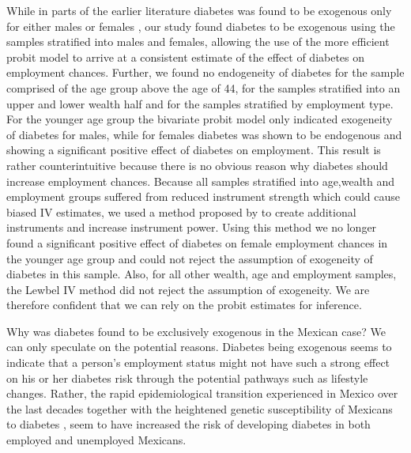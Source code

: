 While in parts of the earlier literature diabetes was found
to be exogenous only for either males or females \parencite{Brown2005,Latif2009},
our study found diabetes to be exogenous using the samples stratified
into males and females, allowing the use of the more efficient probit
model to arrive at a consistent estimate of the effect of diabetes
on employment chances. Further, we found no endogeneity of diabetes
for the sample comprised of the age group above the age of 44,  for
the samples stratified into an upper and lower wealth half and for
the samples stratified by employment type. For the younger age group
the bivariate probit model only indicated exogeneity of diabetes for
males, while for females diabetes was shown to be endogenous and showing
a significant positive effect of diabetes on employment. This result
is rather counterintuitive because there is no obvious reason why
diabetes should increase employment chances. Because all samples stratified
into age,wealth and employment groups suffered from reduced instrument
strength which could cause biased \ac{IV} estimates, we used a method
proposed by \textcite{Lewbel2012} to create additional instruments and
increase instrument power. Using this method we no longer found a
significant positive effect of diabetes on female employment chances
in the younger age group and could not reject the assumption of exogeneity
of diabetes in this sample. Also, for all other wealth, age and employment
samples, the Lewbel \ac{IV} method did not reject the assumption
of exogeneity. We are therefore confident that we can rely on the
probit estimates for inference.

Why was diabetes found to be exclusively exogenous in the Mexican
case? We can only speculate on the potential reasons. Diabetes being
exogenous seems to indicate that a person's employment status might
not have such a strong effect on his or her diabetes risk through
the potential pathways such as lifestyle changes. Rather, the rapid
epidemiological transition experienced in Mexico over the last decades
\parencite{Barquera2006,Barquera2008b,Rivera2002a} together with the
heightened genetic susceptibility of Mexicans to diabetes \parencite{Williams2013},
seem to have increased the risk of developing diabetes in both employed
and unemployed Mexicans.

